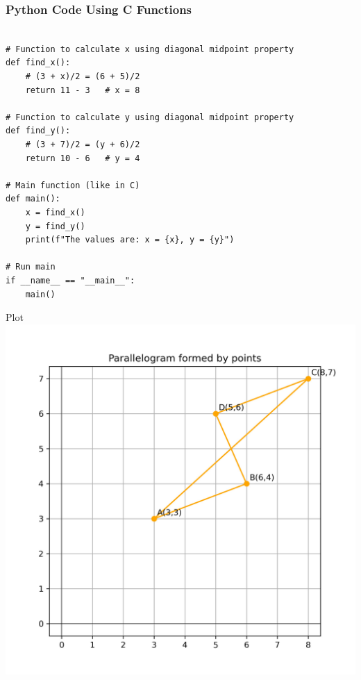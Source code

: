 \documentclass{beamer}
\begin{document}
\begin{frame}[fragile]
    \frametitle{Python Code Using C Functions}
    \begin{lstlisting}
    
# Function to calculate x using diagonal midpoint property
def find_x():
    # (3 + x)/2 = (6 + 5)/2
    return 11 - 3   # x = 8

# Function to calculate y using diagonal midpoint property
def find_y():
    # (3 + 7)/2 = (y + 6)/2
    return 10 - 6   # y = 4

# Main function (like in C)
def main():
    x = find_x()
    y = find_y()
    print(f"The values are: x = {x}, y = {y}")

# Run main
if __name__ == "__main__":
    main()
     \end{lstlisting}

\end{frame}

    

\begin{frame}{Plot}
    \centering
    \includegraphics[width=\columnwidth, height=0.8\textheight, keepaspectratio]{Figs/IMG-20250829-WA0000.jpg}     
\end{frame}
\end{document}

